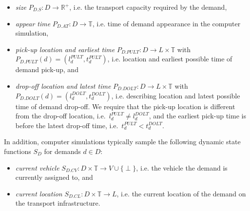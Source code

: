 \documentclass[graybox]{svmult}
\begin{document}
\begin{itemize}
	\item \textit{size} $P_{D.S}: D \rightarrow \mathbb{R}^+$, i.e. the transport capacity required by the demand,
	\item \textit{appear time} $P_{D.AT}: D \rightarrow \mathbb{T}$, i.e. time of demand appearance in the computer simulation,
	\item \textit{pick-up location and earliest time} $P_{D.PULT}: D \rightarrow L \times \mathbb{T}$ with $P_{D.PULT}(d) = (l_d^{PULT},t_d^{PULT})$, i.e. location and earliest possible time of demand pick-up, and
	\item \textit{drop-off location and latest time} $P_{D.DOLT}: D \rightarrow L \times \mathbb{T}$ with $P_{D.DOLT}(d) = (l_d^{DOLT},t_d^{DOLT})$, i.e. describing location and latest possible time of demand drop-off. We require that the pick-up location is different from the drop-off location, i.e.\ $l_d^{PULT} \neq l_d^{DOLT}$, and the earliest pick-up time is before the latest drop-off time, i.e.\ $t_d^{PULT} < t_d^{DOLT}$.
\end{itemize}
In addition, computer simulations typically sample the following dynamic state functions $S_{D}$ for demands $d \in D$:
\begin{itemize}
	\item \textit{current vehicle} $S_{D.CV}: D \times \mathbb{T} \rightarrow V \cup \{\perp\}$, i.e. the vehicle the demand is currently assigned to, and
	\item \textit{current location} $S_{D.CL}: D \times \mathbb{T} \rightarrow L$, i.e. the current location of the demand on the transport infrastructure.
\end{itemize}

\end{document}
